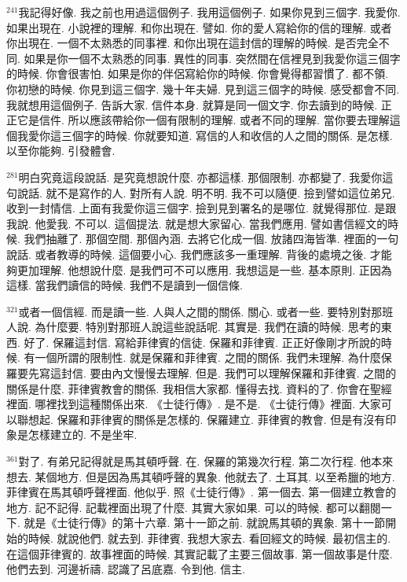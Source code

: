\documentclass{book}
\begin{document}
$^{241}$我記得好像.
我之前也用過這個例子.
我用這個例子.
如果你見到三個字.
我愛你.
如果出現在.
小說裡的理解.
和你出現在.
譬如.
你的愛人寫給你的信的理解.
或者你出現在.
一個不太熟悉的同事裡.
和你出現在這封信的理解的時候.
是否完全不同.
如果是你一個不太熟悉的同事.
異性的同事.
突然間在信裡見到我愛你這三個字的時候.
你會很害怕.
如果是你的伴侶寫給你的時候.
你會覺得都習慣了.
都不領.
你初戀的時候.
你見到這三個字.
幾十年夫婦.
見到這三個字的時候.
感受都會不同.
我就想用這個例子.
告訴大家.
信件本身.
就算是同一個文字.
你去讀到的時候.
正正它是信件.
所以應該帶給你一個有限制的理解.
或者不同的理解.
當你要去理解這個我愛你這三個字的時候.
你就要知道.
寫信的人和收信的人之間的關係.
是怎樣.
以至你能夠.
引發體會.

$^{281}$明白究竟這段說話.
是究竟想說什麼.
亦都這樣.
那個限制.
亦都變了.
我愛你這句說話.
就不是寫作的人.
對所有人說.
明不明.
我不可以隨便.
撿到譬如這位弟兄.
收到一封情信.
上面有我愛你這三個字.
撿到見到署名的是哪位.
就覺得那位.
是跟我說.
他愛我.
不可以.
這個提法.
就是想大家留心.
當我們應用.
譬如書信經文的時候.
我們抽離了.
那個空間.
那個內涵.
去將它化成一個.
放諸四海皆準.
裡面的一句說話.
或者教導的時候.
這個要小心.
我們應該多一重理解.
背後的處境之後.
才能夠更加理解.
他想說什麼.
是我們可不可以應用.
我想這是一些.
基本原則.
正因為這樣.
當我們讀信的時候.
我們不是讀到一個信條.

$^{321}$或者一個信經.
而是讀一些.
人與人之間的關係.
關心.
或者一些.
要特別對那班人說.
為什麼要.
特別對那班人說這些說話呢.
其實是.
我們在讀的時候.
思考的東西.
好了.
保羅這封信.
寫給菲律賓的信徒.
保羅和菲律賓.
正正好像剛才所說的時候.
有一個所謂的限制性.
就是保羅和菲律賓.
之間的關係.
我們未理解.
為什麼保羅要先寫這封信.
要由內文慢慢去理解.
但是.
我們可以理解保羅和菲律賓.
之間的關係是什麼.
菲律賓教會的關係.
我相信大家都.
懂得去找.
資料的了.
你會在聖經裡面.
哪裡找到這種關係出來.
《士徒行傳》.
是不是.
《士徒行傳》裡面.
大家可以聯想起.
保羅和菲律賓的關係是怎樣的.
保羅建立.
菲律賓的教會.
但是有沒有印象是怎樣建立的.
不是坐牢.

$^{361}$對了.
有弟兄記得就是馬其頓呼聲.
在.
保羅的第幾次行程.
第二次行程.
他本來想去.
某個地方.
但是因為馬其頓呼聲的異象.
他就去了.
土耳其.
以至希臘的地方.
菲律賓在馬其頓呼聲裡面.
他似乎.
照《士徒行傳》.
第一個去.
第一個建立教會的地方.
記不記得.
記載裡面出現了什麼.
其實大家如果.
可以的時候.
都可以翻閱一下.
就是《士徒行傳》的第十六章.
第十一節之前.
就說馬其頓的異象.
第十一節開始的時候.
就說他們.
就去到.
菲律賓.
我想大家去.
看回經文的時候.
最初信主的.
在這個菲律賓的.
故事裡面的時候.
其實記載了主要三個故事.
第一個故事是什麼.
他們去到.
河邊祈禱.
認識了呂底嘉.
令到他.
信主.
\end{document}
